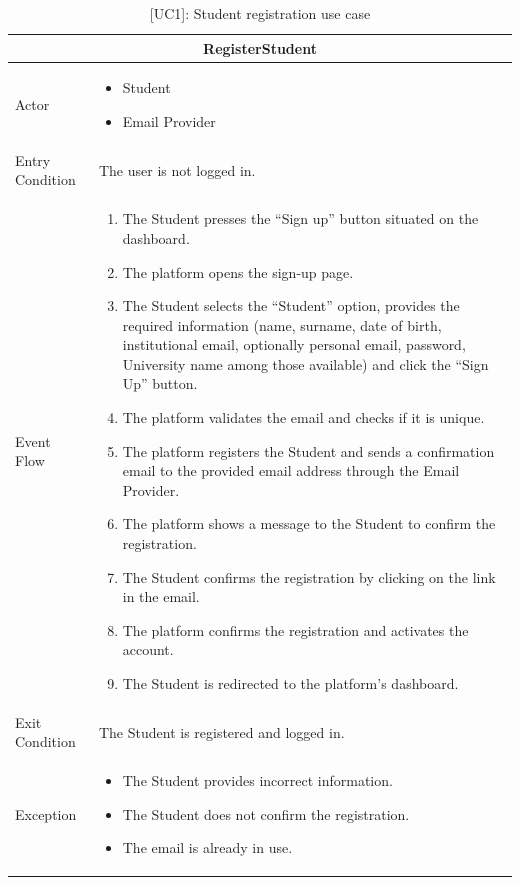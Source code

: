 \begin{table}[H]
    \centering
    \begin{tabular}{|p{3cm}|p{12cm}|}
    \hline
    \multicolumn{2}{|c|}{\textbf{RegisterStudent}} \\ \hline
    Actor & 
    \begin{itemize}
        \item Student
        \item Email Provider
    \end{itemize} \\ \hline
    Entry Condition & The user is not logged in. \\ \hline
    Event Flow & 
    \begin{enumerate}         
        \item The Student presses the “Sign up” button situated on the dashboard.
        \item The platform opens the sign-up page.
        \item The Student selects the “Student” option, provides the required information (name, surname, date of birth, institutional email, optionally personal email, password, University name among those available) and click the “Sign Up” button.
        \item The platform validates the email and checks if it is unique.
        \item The platform registers the Student and sends a confirmation email to the provided email address through the Email Provider.
        \item The platform shows a message to the Student to confirm the registration.
        \item The Student confirms the registration by clicking on the link in the email.
        \item The platform confirms the registration and activates the account.
        \item The Student is redirected to the platform's dashboard.
    \end{enumerate} \\ \hline
    Exit Condition & The Student is registered and logged in. \\ \hline
    Exception & 
    \begin{itemize}
        \item The Student provides incorrect information.
        \item The Student does not confirm the registration.
        \item The email is already in use.
    \end{itemize} \\ \hline
    \end{tabular}
    \caption{[UC1]: Student registration use case}
    \label{tab:UC1}
\end{table}
